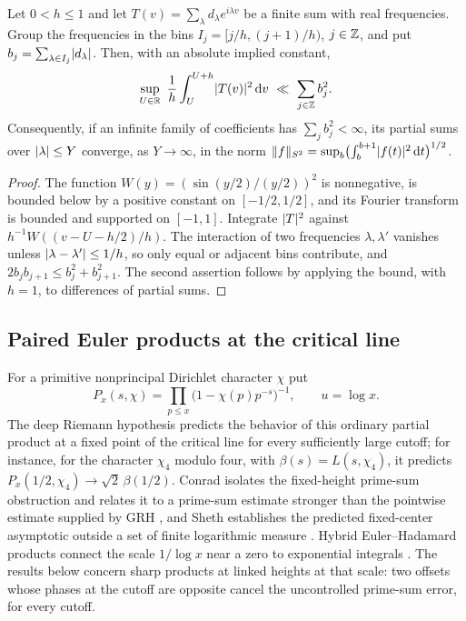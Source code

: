 \begin{lemma}\label{zer:lem:bins}
Let $0<h\le1$ and let $T(v)=\sum_{\lambda}d_\lambda e^{i\lambda v}$ be a finite sum with real
frequencies. Group the frequencies in the bins $I_j=[j/h,(j+1)/h)$, $j\in\mathbb{Z}$, and put
$b_j=\sum_{\lambda\in I_j}\lvert d_\lambda\rvert$. Then, with an absolute implied constant,
\[
 \sup_{U\in\R}\ \frac1h\int_U^{U+h}\abs{T(v)}^2\,\dd v\ \ll\ \sum_{j\in\Z}b_j^2 .
\]
Consequently, if an infinite family of coefficients has $\sum_jb_j^2<\infty$, its partial sums
over $\lvert\lambda\rvert\le Y$ converge, as $Y\to\infty$, in the norm
$\lVert f\rVert_{S^2}=\sup_b\bigl(\int_b^{b+1}\lvert f(t)\rvert^2\,\mathrm{d} t\bigr)^{1/2}$.
\end{lemma}
\begin{proof}
The function $W(y)=(\sin(y/2)/(y/2))^2$ is nonnegative, is bounded below by a positive constant
on $[-1/2,1/2]$, and its Fourier transform is bounded and supported on $[-1,1]$. Integrate
$\lvert T\rvert^2$ against $h^{-1}W((v-U-h/2)/h)$. The interaction of two frequencies
$\lambda,\lambda'$ vanishes unless $\lvert\lambda-\lambda'\rvert\le1/h$, so only equal or adjacent
bins contribute, and $2b_jb_{j+1}\le b_j^2+b_{j+1}^2$. The second assertion follows by applying
the bound, with $h=1$, to differences of partial sums.
\end{proof}

\subsection{Paired Euler products at the critical line}\label{zer:sec:euler}

For a primitive nonprincipal Dirichlet character $\chi$ put
\[
 P_x(s,\chi)=\prod_{p\le x}\bigl(1-\chi(p)p^{-s}\bigr)^{-1},\qquad u=\log x .
\]
The deep Riemann hypothesis predicts the behavior of this ordinary partial product at a fixed
point of the critical line for every sufficiently large cutoff; for instance, for the character
$\chi_4$ modulo four, with $\beta(s)=L(s,\chi_4)$, it predicts
$P_x(1/2,\chi_4)\to\sqrt2\,\beta(1/2)$. Conrad isolates the fixed-height prime-sum obstruction
and relates it to a prime-sum estimate stronger than the pointwise estimate supplied by GRH
\cite{Conrad2005Partial,Kaneko2022Euler}, and Sheth establishes the predicted fixed-center
asymptotic outside a set of finite logarithmic measure \cite{Sheth2025Euler}. Hybrid
Euler--Hadamard products connect the scale $1/\log x$ near a zero to exponential integrals
\cite{GonekHughesKeating2007Hybrid,BuiKeating2007Mean}. The results below concern sharp
products at linked heights at that scale: two offsets whose phases at the cutoff are opposite
cancel the uncontrolled prime-sum error, for every cutoff.

